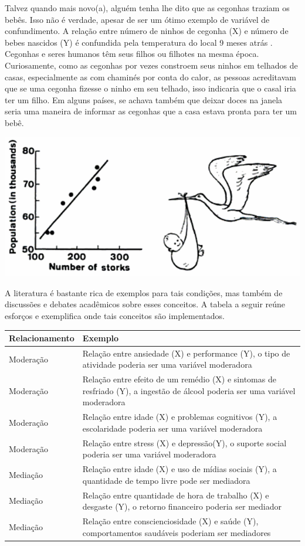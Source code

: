 \documentclass[
]{book}
\begin{document}
Talvez quando mais novo(a), alguém tenha lhe dito que as cegonhas traziam os bebês. Isso não é verdade, apesar de ser um ótimo exemplo de variável de confundimento. A relação entre número de ninhos de cegonha (X) e número de bebes nascidos (Y) é confundida pela temperatura do local 9 meses atrás \citep{Matthews2000}. Cegonhas e seres humanos têm seus filhos ou filhotes na mesma época. Curiosamente, como as cegonhas por vezes constroem seus ninhos em telhados de casas, especialmente as com chaminés por conta do calor, as pessoas acreditavam que se uma cegonha fizesse o ninho em seu telhado, isso indicaria que o casal iria ter um filho. Em alguns países, se achava também que deixar doces na janela seria uma maneira de informar as cegonhas que a casa estava pronta para ter um bebê.

\includegraphics{./img/cap_cegonha.png}

A literatura é bastante rica de exemplos para tais condições, mas também de discussões e debates acadêmicos sobre esses conceitos. A tabela a seguir reúne esforços e exemplifica onde tais conceitos são implementados.

\begin{longtable}[]{@{}
  >{\raggedright\arraybackslash}p{}
  >{\raggedright\arraybackslash}p{}@{}}
\toprule
Relacionamento & Exemplo \\
\midrule
\endhead
Moderação & Relação entre ansiedade (X) e performance (Y), o tipo de atividade poderia ser uma variável moderadora \\
Moderação & Relação entre efeito de um remédio (X) e sintomas de resfriado (Y), a ingestão de álcool poderia ser uma variável moderadora \\
Moderação & Relação entre idade (X) e problemas cognitivos (Y), a escolaridade poderia ser uma variável moderadora \\
Moderação & Relação entre stress (X) e depressão(Y), o suporte social poderia ser uma variável moderadora \\
Mediação & Relação entre idade (X) e uso de mídias sociais (Y), a quantidade de tempo livre pode ser mediadora \\
Mediação & Relação entre quantidade de hora de trabalho (X) e desgaste (Y), o retorno financeiro poderia ser mediador \\
Mediação & Relação entre conscienciosidade (X) e saúde (Y), comportamentos saudáveis poderiam ser mediadores \\
\bottomrule
\end{longtable}
\end{document}
